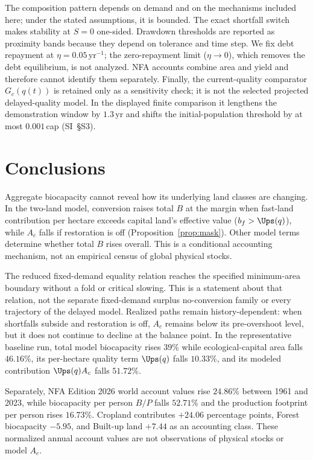 The composition pattern depends on demand and on the mechanisms included here; under the stated assumptions, it is bounded. The exact shortfall switch makes stability at $S=0$ one-sided. Drawdown thresholds are reported as proximity bands because they depend on tolerance and time step. We fix debt repayment at $\eta=0.05$\,yr$^{-1}$; the zero-repayment limit ($\eta\to0$), which removes the debt equilibrium, is not analyzed. NFA accounts combine area and yield and therefore cannot identify them separately. Finally, the current-quality comparator $G_c(q(t))$ is retained only as a sensitivity check; it is not the selected projected delayed-quality model. In the displayed finite comparison it lengthens the demonstration window by $1.3$\,yr and shifts the initial-population threshold by at most $0.001$\,cap (SI~\S S3).

\section{Conclusions}\label{sec:conclusions}

Aggregate biocapacity cannot reveal how its underlying land classes are changing. In the two-land model, conversion raises total $B$ at the margin when fast-land contribution per hectare exceeds capital land's effective value ($b_f>\Ups(q)$), while $A_c$ falls if restoration is off (Proposition~\ref{prop:mask}). Other model terms determine whether total $B$ rises overall. This is a conditional accounting mechanism, not an empirical census of global physical stocks.

The reduced fixed-demand equality relation reaches the specified minimum-area boundary without a fold or critical slowing. This is a statement about that relation, not the separate fixed-demand surplus no-conversion family or every trajectory of the delayed model. Realized paths remain history-dependent: when shortfalls subside and restoration is off, $A_c$ remains below its pre-overshoot level, but it does not continue to decline at the balance point. In the representative baseline run, total model biocapacity rises $39\%$ while ecological-capital area falls $46.16\%$, its per-hectare quality term $\Ups(q)$ falls $10.33\%$, and its modeled contribution $\Ups(q)A_c$ falls $51.72\%$.

Separately, NFA Edition 2026 world account values rise $24.86\%$ between 1961 and 2023, while biocapacity per person $B/P$ falls $52.71\%$ and the production footprint per person rises $16.73\%$. Cropland contributes $+24.06$ percentage points, Forest biocapacity $-5.95$, and Built-up land $+7.44$ as an accounting class. These normalized annual account values are not observations of physical stocks or model $A_c$.

